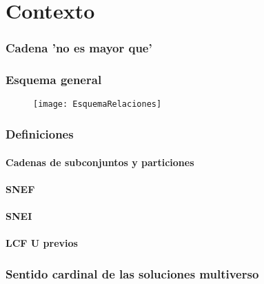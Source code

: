 \chapter{Contexto}

\subsection{Cadena 'no es mayor que'}

\newpage
\subsection{Esquema general}
	\begin{figure}[h!]
		\texttt{[image: EsquemaRelaciones]}
		\centering
	\end{figure}

\newpage
\subsection{Definiciones}
\subsubsection{Cadenas de subconjuntos y particiones}
\subsubsection{SNEF}
\subsubsection{SNEI}
\subsubsection{LCF U previos}



\newpage
\subsection{Sentido cardinal de las soluciones multiverso}